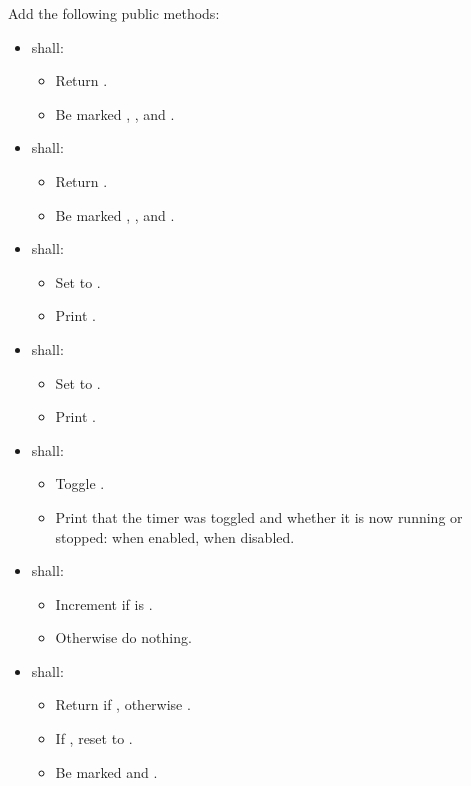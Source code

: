 Add the following public methods:
\begin{itemize}
  \item {} shall:
  \begin{itemize}
    \item Return .
    \item Be marked , , and \code{[[nodiscard]]}.
  \end{itemize}
  \item {} shall:
  \begin{itemize}
    \item Return .
    \item Be marked , , and \code{[[nodiscard]]}.
  \end{itemize}
  \item {} shall:
  \begin{itemize}
    \item Set  to .
    \item Print .
  \end{itemize}
  \item {} shall:
  \begin{itemize}
    \item Set  to .
    \item Print .
  \end{itemize}
  \item {} shall:
  \begin{itemize}
    \item Toggle .
    \item Print that the timer was toggled and whether it is now running or stopped:
       when enabled,  when disabled.
  \end{itemize}
  \item {} shall:
  \begin{itemize}
    \item Increment  if  is .
    \item Otherwise do nothing.
  \end{itemize}
  \item {} shall:
  \begin{itemize}
    \item Return  if , otherwise .
    \item If , reset  to .
    \item Be marked  and \code{[[nodiscard]]}.
  \end{itemize}
\end{itemize}


